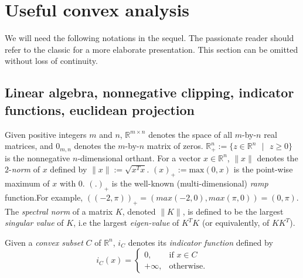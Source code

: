 \documentclass[12pt]{article}
\begin{document}


\section{Useful convex analysis}
\label{sec:notation}
We will need the following notations in the sequel. The passionate reader should refer to the classic \cite{rockafellar1997convex} for a more elaborate presentation. This section can be omitted without loss of continuity.

\subsection{Linear algebra, nonnegative clipping, indicator functions, euclidean projection}
Given positive integers $m$ and $n$, $\mathbb{R}^{m \times n}$ denotes
the space of all $m$-by-$n$ real matrices, and $0_{m,n}$ denotes the $m$-by-$n$ matrix of zeros.
$\mathbb{R}^{n}_+ := \{z \in \mathbb{R}^{n}\text{ }|\text{ } z \geq 0\}$ is the nonnegative $n$-dimensional orthant.  For a vector $x \in \mathbb{R}^n$, $\|x\|$ denotes the $2$-\textit{norm} of $x$ defined by $\|x\| := \sqrt{x^Tx}$.
$(x)_+:=\text{max}(0, x)$ is the point-wise maximum of $x$ with 0. $(.)_+$ is the well-known (multi-dimensional) \textit{ramp} function.For example, $((-2, \pi))_+ = (max(-2, 0), max(\pi, 0)) = (0, \pi)$. The \textit{spectral norm} of a matrix $K$,
denoted $\|K\|$, is defined to be the largest \textit{singular value} of $K$, i.e the largest \textit{eigen-value} of $K^TK$ (or equivalently, of $KK^T$).

Given a \textit{convex subset} $C$ of $\mathbb{R}^n$, $i_C$ denotes its \textit{indicator function} defined by
\begin{equation}
  i_C(x) = \begin{cases}
    0, &\mbox{if } x \in C\\
    +\infty, &\mbox{otherwise}.
    \end{cases}
  \end{equation}
\end{document}
